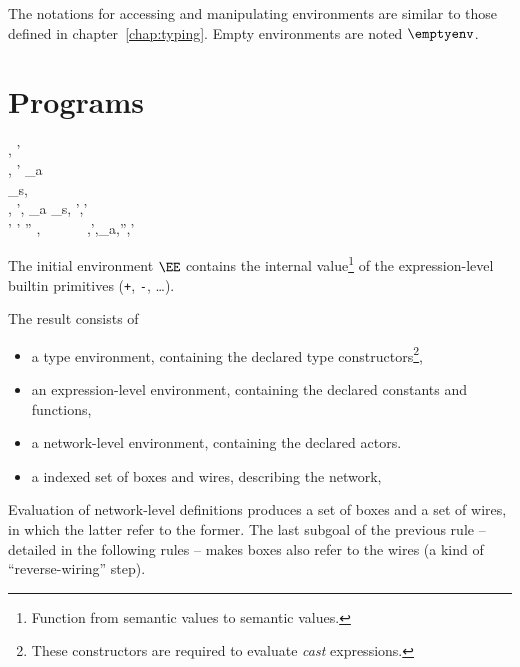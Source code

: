 The notations for accessing and manipulating environments are similar to those defined in
chapter~\ref{chap:typing}. Empty environments are noted $\emptyenv$.

\newpage
\section{Programs}
\label{sec:static-programs}


\infrule[Program]
{ \TE, \EE \vdash {} \gives \EE' \\
  \TE, \EE' \vdash {} \gives \NE_a \\
  \TE \vdash {} \gives \NE_s,\BB \\
  \TE, \EE \oplus \EE', \NE_a \oplus \NE_s, \BB \vdash {} \gives \BB',\WW' \\
  \WW' \vdash \BB \oplus \BB' \gives \BB''}
{\TE, \EE \vdash
  ~~~~~\gives~\TE,\EE',\NE_a,\BB'',\WW'}

The initial environment $\EE$ contains the internal value\footnote{Function from
  semantic values to semantic values.} of the expression-level builtin primitives (\texttt{+},
\texttt{-}, \ldots). 

\medskip
The result consists of
\begin{itemize}
\item a type environment, containing the declared type constructors\footnote{These constructors are
    required to evaluate \emph{cast} expressions.},
\item an expression-level environment, containing the declared constants and functions,
\item a network-level environment, containing the declared actors.
\item a indexed set of boxes and wires, describing the network,
\end{itemize}

\medskip
Evaluation of network-level definitions produces a set of boxes and a set of wires, in which the latter
refer to the former. The last subgoal of the previous rule -- detailed in the following rules --
makes boxes also refer to the wires (a kind of  ``reverse-wiring'' step).

